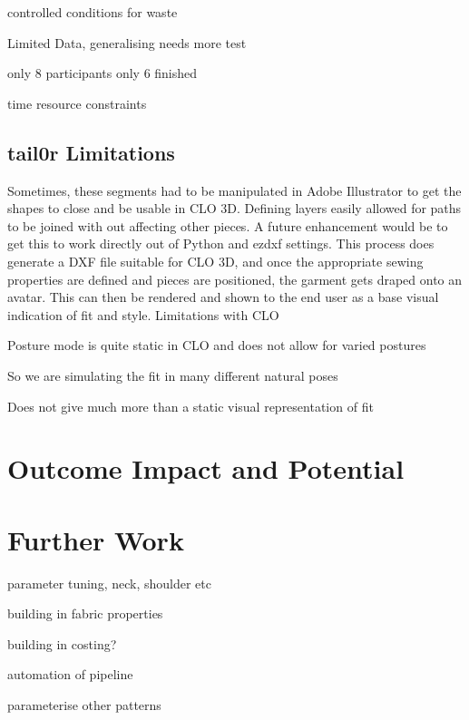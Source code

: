 controlled conditions for waste

Limited Data, generalising needs more test

only 8 participants only 6 finished

time resource constraints

\subsection{tail0r Limitations}

Sometimes, these segments had to be manipulated in Adobe Illustrator to get the shapes to close and be usable in CLO 3D. Defining layers easily allowed for paths to be joined with out affecting other pieces. A future enhancement would be to get this to work directly out of Python and ezdxf settings. This process does generate a DXF file suitable for CLO 3D, and once the appropriate sewing properties are defined and pieces are positioned, the garment gets draped onto an avatar. This can then be rendered and shown to the end user as a base visual indication of fit and style.
Limitations with CLO

Posture mode is quite static in CLO and does not allow for varied postures

So we are simulating the fit in many different natural poses

Does not give much more than a static visual representation of fit

\section{Outcome Impact and Potential}

\section{Further Work}
parameter tuning, neck, shoulder etc

building in fabric properties

building in costing?

automation of pipeline

parameterise other patterns
